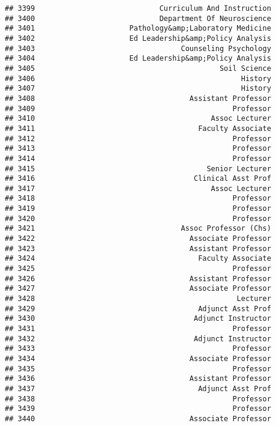 \documentclass[
]{article}
\begin{document}
\begin{verbatim}
## 3399                             Curriculum And Instruction
## 3400                             Department Of Neuroscience
## 3401                      Pathology&amp;Laboratory Medicine
## 3402                      Ed Leadership&amp;Policy Analysis
## 3403                                  Counseling Psychology
## 3404                      Ed Leadership&amp;Policy Analysis
## 3405                                           Soil Science
## 3406                                                History
## 3407                                                History
## 3408                                    Assistant Professor
## 3409                                              Professor
## 3410                                         Assoc Lecturer
## 3411                                      Faculty Associate
## 3412                                              Professor
## 3413                                              Professor
## 3414                                              Professor
## 3415                                        Senior Lecturer
## 3416                                     Clinical Asst Prof
## 3417                                         Assoc Lecturer
## 3418                                              Professor
## 3419                                              Professor
## 3420                                              Professor
## 3421                                  Assoc Professor (Chs)
## 3422                                    Associate Professor
## 3423                                    Assistant Professor
## 3424                                      Faculty Associate
## 3425                                              Professor
## 3426                                    Assistant Professor
## 3427                                    Associate Professor
## 3428                                               Lecturer
## 3429                                      Adjunct Asst Prof
## 3430                                     Adjunct Instructor
## 3431                                              Professor
## 3432                                     Adjunct Instructor
## 3433                                              Professor
## 3434                                    Associate Professor
## 3435                                              Professor
## 3436                                    Assistant Professor
## 3437                                      Adjunct Asst Prof
## 3438                                              Professor
## 3439                                              Professor
## 3440                                    Associate Professor

\end{verbatim}
\end{document}
